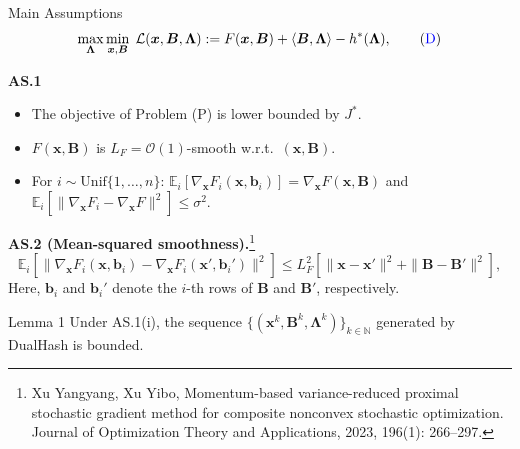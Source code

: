 \documentclass[mathserif,compress,override,9pt]{beamer}
\numberwithin{equation}{section}
\newcommand{\nii}{\noindent}
\newcommand{\EE}{\mathbb{E}}
\newcommand{\bx}{\bm{x}}
\newcommand{\bb}{\bm{b}}
\newcommand{\bB}{\bm{B}}
\newcommand{\bLmbd}{\bm{\Lambda}}
\newcommand{\calL}{\mathcal{L}}
\newcommand{\calO}{\mathcal{O}}
\newcommand{\blue}[1]{\textcolor{blue}{#1}}
\theoremstyle{remark}
\begin{document}
\begin{frame}[t]{Main Assumptions}
\small
\vspace{0.1cm}
\begin{equation}
  \max_{\bLmbd}\min_{\bx,\bB}\;
\calL(\bx,\bB,\bLmbd)
:=
F(\bx,\bB)
+\langle\bB,\bLmbd\rangle
-h^*(\bLmbd), \tag{\blue{D}}
\end{equation}

\vspace{0.2cm}
\nii\textbf{AS.1}
\begin{itemize}
\item[(i)] The objective of Problem (P) is lower bounded by $J^*$.
\item[(ii)] $F(\bx,\bB)$ is $L_F=\calO(1)$-smooth w.r.t.\ $(\bx,\bB)$.
\item[(iii)] For $i\sim\mathrm{Unif}\{1,\dots,n\}$: $\EE_i[\nabla_{\bx}F_i(\bx,\bb_i)]=\nabla_{\bx}F(\bx,\bB)$ and $\EE_i[\|\nabla_{\bx}F_i-\nabla_{\bx}F\|^2]\le\sigma^2$.
\end{itemize}

\vspace{0.2cm}
\textbf{AS.2 (Mean-squared smoothness).}\footnote{Xu Yangyang, Xu Yibo, Momentum-based variance-reduced proximal stochastic gradient method for composite nonconvex stochastic optimization. Journal of Optimization Theory and Applications, 2023, 196(1): 266--297.}
\[
\EE_i\!\left[\|\nabla_{\bx}F_i(\bx,\bb_i)-\nabla_{\bx}F_i(\bx',\bb_i')\|^2\right]\le L_F^2\!\left[\|\bx-\bx'\|^2+\|\bB-\bB'\|^2\right],
\]
Here, $\bb_i$ and $\bb_i'$ denote the $i$-th rows of $\bB$ and $\bB'$, respectively.

\vspace{0.08cm}
\begin{block}{Lemma 1}
\footnotesize
Under AS.1(i), the sequence $\{(\bx^k,\bB^k,\bLmbd^k)\}_{k\in\mathbb{N}}$ generated by
DualHash is bounded.
\end{block}
\end{frame}
\end{document}
